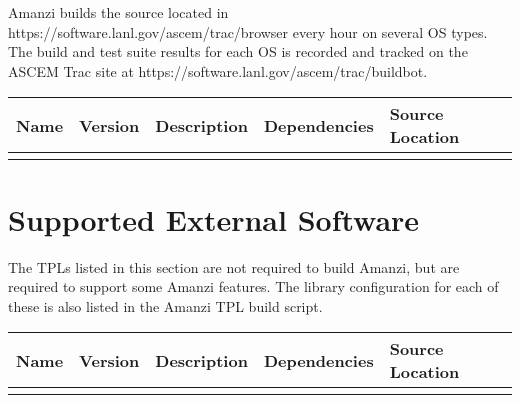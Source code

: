 \documentclass[12pt]{article}
\begin{document}
Amanzi builds the source located in https://software.lanl.gov/ascem/trac/browser every hour on several OS types.
The build and test suite results for each OS is recorded and tracked on the ASCEM Trac
site at https://software.lanl.gov/ascem/trac/buildbot. 

\begin{table}[htdp]
\begin{center}
\begin{tabular}{|c|c|p{3cm}|p{3cm}|p{3cm}|}
\hline
\hline
Name & Version & Description & Dependencies & Source Location \\
\hline
&&&& \\
\hline


\end{tabular}
\end{center}
\label{default}
\end{table}%


\section*{Supported External Software}
The TPLs listed in this section are not required to build Amanzi, but are required to support some Amanzi features. The 
library configuration for each of these is also listed in the Amanzi TPL build script. 

\begin{table}[htdp]
\begin{center}
\begin{tabular}{|c|c|p{3cm}|p{3cm}|p{3cm}|}
\hline
\hline
Name & Version & Description & Dependencies & Source Location \\
\hline
&&&& \\
\hline


\end{tabular}
\end{center}
\label{default}
\end{table}%
\end{document}
